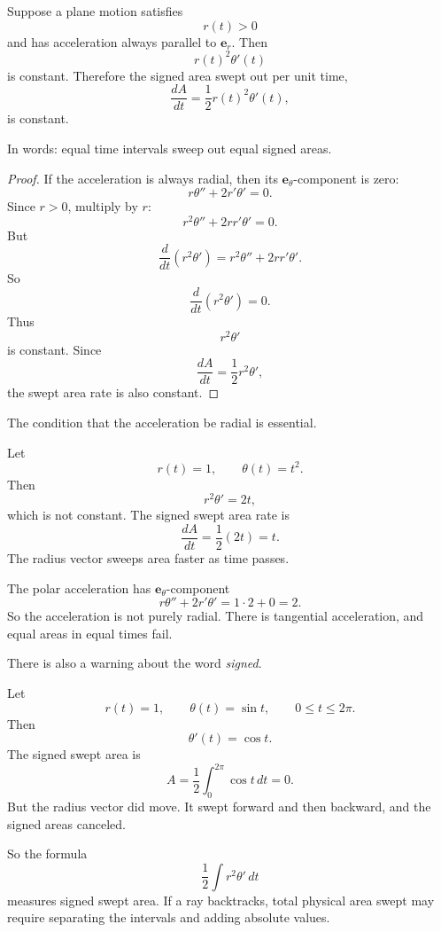 \begin{theorem}
Suppose a plane motion satisfies
\[
    r(t)>0
\]
and has acceleration always parallel to \(\mathbf e_r\).  Then
\[
    r(t)^2\theta'(t)
\]
is constant.  Therefore the signed area swept out per unit time,
\[
\boxed{
    \frac{dA}{dt}=\frac12r(t)^2\theta'(t),
}
\]
is constant.

In words: equal time intervals sweep out equal signed areas.
\end{theorem}

\begin{proof}
If the acceleration is always radial, then its \(\mathbf e_\theta\)-component is zero:
\[
    r\theta''+2r'\theta'=0.
\]
Since \(r>0\), multiply by \(r\):
\[
    r^2\theta''+2rr'\theta'=0.
\]
But
\[
    \frac{d}{dt}(r^2\theta')
    =
    r^2\theta''+2rr'\theta'.
\]
So
\[
    \frac{d}{dt}(r^2\theta')=0.
\]
Thus
\[
    r^2\theta'
\]
is constant.  Since
\[
    \frac{dA}{dt}=\frac12r^2\theta',
\]
the swept area rate is also constant.
\end{proof}

The condition that the acceleration be radial is essential.

\begin{example}
Let
\[
    r(t)=1,
    \qquad
    \theta(t)=t^2.
\]
Then
\[
    r^2\theta'=2t,
\]
which is not constant.  The signed swept area rate is
\[
    \frac{dA}{dt}=\frac12(2t)=t.
\]
The radius vector sweeps area faster as time passes.

The polar acceleration has \(\mathbf e_\theta\)-component
\[
    r\theta''+2r'\theta'=1\cdot2+0=2.
\]
So the acceleration is not purely radial.  There is tangential acceleration, and equal
areas in equal times fail.
\end{example}

There is also a warning about the word \emph{signed}.

\begin{example}
Let
\[
    r(t)=1,
    \qquad
    \theta(t)=\sin t,
    \qquad
    0\le t\le2\pi.
\]
Then
\[
    \theta'(t)=\cos t.
\]
The signed swept area is
\[
    A=\frac12\int_0^{2\pi}\cos t\,dt=0.
\]
But the radius vector did move.  It swept forward and then backward, and the signed
areas canceled.

So the formula
\[
    \frac12\int r^2\theta'\,dt
\]
measures signed swept area.  If a ray backtracks, total physical area swept may require
separating the intervals and adding absolute values.
\end{example}

